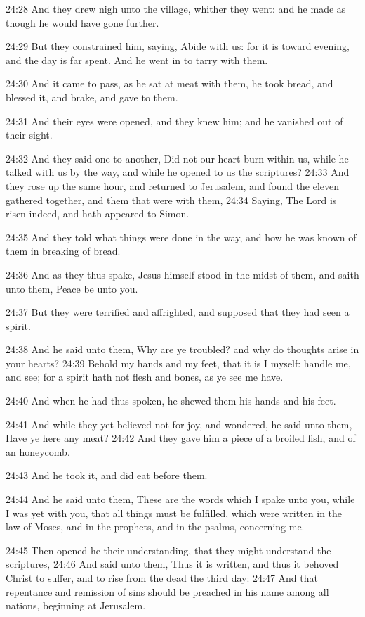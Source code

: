 24:28 And they drew nigh unto the village, whither they went: and he
made as though he would have gone further.

24:29 But they constrained him, saying, Abide with us: for it is
toward evening, and the day is far spent. And he went in to tarry with
them.

24:30 And it came to pass, as he sat at meat with them, he took bread,
and blessed it, and brake, and gave to them.

24:31 And their eyes were opened, and they knew him; and he vanished
out of their sight.

24:32 And they said one to another, Did not our heart burn within us,
while he talked with us by the way, and while he opened to us the
scriptures?  24:33 And they rose up the same hour, and returned to
Jerusalem, and found the eleven gathered together, and them that were
with them, 24:34 Saying, The Lord is risen indeed, and hath appeared
to Simon.

24:35 And they told what things were done in the way, and how he was
known of them in breaking of bread.

24:36 And as they thus spake, Jesus himself stood in the midst of
them, and saith unto them, Peace be unto you.

24:37 But they were terrified and affrighted, and supposed that they
had seen a spirit.

24:38 And he said unto them, Why are ye troubled? and why do thoughts
arise in your hearts?  24:39 Behold my hands and my feet, that it is I
myself: handle me, and see; for a spirit hath not flesh and bones, as
ye see me have.

24:40 And when he had thus spoken, he shewed them his hands and his
feet.

24:41 And while they yet believed not for joy, and wondered, he said
unto them, Have ye here any meat?  24:42 And they gave him a piece of
a broiled fish, and of an honeycomb.

24:43 And he took it, and did eat before them.

24:44 And he said unto them, These are the words which I spake unto
you, while I was yet with you, that all things must be fulfilled,
which were written in the law of Moses, and in the prophets, and in
the psalms, concerning me.

24:45 Then opened he their understanding, that they might understand
the scriptures, 24:46 And said unto them, Thus it is written, and thus
it behoved Christ to suffer, and to rise from the dead the third day:
24:47 And that repentance and remission of sins should be preached in
his name among all nations, beginning at Jerusalem.

